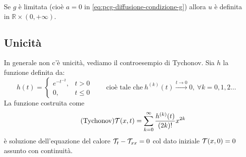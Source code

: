 \documentclass[10pt,a4paper,twoside,openright]{book}
\begin{document}

\begin{oss}
    Se $g$ è limitata (cioè $a=0$ in \eqref{eq:pcg-diffusione-condizione-g}) allora $u$ è definita in $\mathbb{R} \times (0,+\infty)$.
\end{oss}
\subsection{Unicità}

In generale non c'è unicità, vediamo il controesempio di Tychonov. Sia $h$ la funzione definita da:
\begin{equation*}
    h(t) =
    \begin{cases}
        e^{-t^{-2}}, & t >0         \\
        0,           & t\leqslant 0
    \end{cases} \qquad \text{cioè tale che} \ h^{(k)}(t)\xrightarrow{t\rightarrow 0} 0,\ \forall k=0,1,2\dotsc
\end{equation*}
La funzione costruita come
\begin{equation}
    \tag{Tychonov}
    \mathcal{T} (x,t) =\sum\limits ^{\infty }_{k=0}\frac{h^{(k)}(t)}{(2k) !} x^{2k}
\end{equation}
è soluzione dell'equazione del calore $\mathcal{T} _{t} -\mathcal{T} _{xx} =0$ col dato iniziale $\mathcal{T} (x,0)=0$ assunto con continuità.
\end{document}
